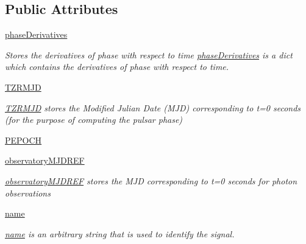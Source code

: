\subsection*{Public Attributes}
\begin{DoxyCompactItemize}
\item 
\hyperlink{classmodest_1_1signals_1_1periodicxraysource_1_1PeriodicXRaySource_aba99ee47fdedf6cb2fe5a78fc85d1baa}{phase\+Derivatives}
\begin{DoxyCompactList}\small\item\em Stores the derivatives of phase with respect to time  \hyperlink{classmodest_1_1signals_1_1periodicxraysource_1_1PeriodicXRaySource_aba99ee47fdedf6cb2fe5a78fc85d1baa}{phase\+Derivatives} is a dict which contains the derivatives of phase with respect to time. \end{DoxyCompactList}\item 
\hyperlink{classmodest_1_1signals_1_1periodicxraysource_1_1PeriodicXRaySource_a623878bc6ceaa59a60e0f3942768ba5c}{T\+Z\+R\+M\+JD}
\begin{DoxyCompactList}\small\item\em \hyperlink{classmodest_1_1signals_1_1periodicxraysource_1_1PeriodicXRaySource_a623878bc6ceaa59a60e0f3942768ba5c}{T\+Z\+R\+M\+JD} stores the Modified Julian Date (M\+JD) corresponding to t=0 seconds (for the purpose of computing the pulsar phase) \end{DoxyCompactList}\item 
\hyperlink{classmodest_1_1signals_1_1periodicxraysource_1_1PeriodicXRaySource_ae41de05104c0279bd59a47ff188020ea}{P\+E\+P\+O\+CH}
\item 
\hyperlink{classmodest_1_1signals_1_1periodicxraysource_1_1PeriodicXRaySource_a5300e5a9624bd81d7e2c8f2322653713}{observatory\+M\+J\+D\+R\+EF}
\begin{DoxyCompactList}\small\item\em \hyperlink{classmodest_1_1signals_1_1periodicxraysource_1_1PeriodicXRaySource_a5300e5a9624bd81d7e2c8f2322653713}{observatory\+M\+J\+D\+R\+EF} stores the M\+JD corresponding to t=0 seconds for photon observations \end{DoxyCompactList}\item 
\hyperlink{classmodest_1_1signals_1_1periodicxraysource_1_1PeriodicXRaySource_aec42837776d331b803fe786647763be5}{name}
\begin{DoxyCompactList}\small\item\em \hyperlink{classmodest_1_1signals_1_1periodicxraysource_1_1PeriodicXRaySource_aec42837776d331b803fe786647763be5}{name} is an arbitrary string that is used to identify the signal. \end{DoxyCompactList}\item 

\end{DoxyCompactItemize}
